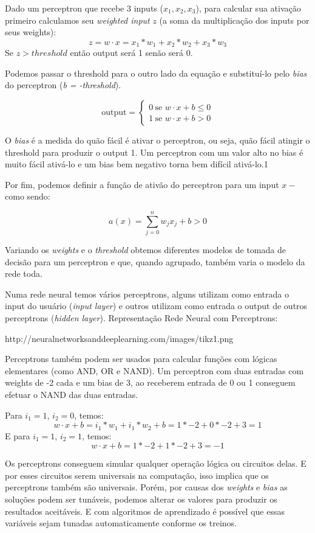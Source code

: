 \documentclass[11pt,a4paper,leqno]{article}
\begin{document}
Dado um perceptron que recebe 3 inputs ($x_1, x_2, x_3$), para calcular sua ativação primeiro calculamos seu \emph{weighted input} $z$ (a soma da multiplicação dos inputs por seus weights):
\[
	z = w \cdot x = x_1 * w_1 + x_2 * w_2 + x_3 * w_3
\]
Se $z > threshold$ então output será 1 senão será 0.

Podemos passar o threshold para o outro lado da equação e substituí-lo pelo \emph{bias} do perceptron (\emph{b = -threshold}).

\[
  \mbox{output} = \left\{ 
    \begin{array}{ll} 
      0 \ \mbox{se } w\cdot x + b \leq 0 \\
      1 \ \mbox{se } w\cdot x + b > 0
    \end{array}
  \right.
\]

O \emph{bias} é a medida do quão fácil é ativar o perceptron, ou seja, quão fácil atingir o threshold para produzir o output 1.
Um perceptron com um valor alto no bias é muito fácil ativá-lo e um bias bem negativo torna bem difícil ativá-lo.1

Por fim, podemos definir a função de ativão do perceptron para um input \emph{$x-$} como sendo:

\[
a(x) = \sum_{j=0}^n w_j x_j + b > 0
\]

Variando os \emph{weights} e o \emph{threshold} obtemos diferentes modelos de tomada de decisão para um perceptron e que, quando agrupado, também varia o modelo da rede toda.

Numa rede neural temos vários perceptrons, alguns utilizam como entrada o input do usuário (\emph{input layer}) e outros utilizam como entrada o output de outros perceptrons (\emph{hidden layer}).
\linebreak
Representação Rede Neural com Perceptrons:

http://neuralnetworksanddeeplearning.com/images/tikz1.png



Perceptrons também podem ser usados para calcular funções com lógicas elementares (como AND, OR e NAND).
Um perceptron com duas entradas com weights de -2 cada e um bias de 3, ao receberem entrada de 0 ou 1 conseguem efetuar o NAND das duas entradas.

Para $i_1 = 1$, $i_2 = 0$, temos:
\[ w \cdot x + b =  i_1 * w_1 + i_1 * w_2 + b = 1 * -2 + 0 * -2 + 3 = 1 \]
E para $i_1 = 1$, $i_2 = 1$, temos:
\[ w \cdot x + b = 1 * -2 + 1 * -2 + 3 = -1 \]

Os perceptrons conseguem simular qualquer operação lógica ou circuitos delas. E por esses circuitos serem universais na computação, isso implica que os perceptrons também são universais.
Porém, por causas dos \emph{weights} e \emph{bias} as soluções podem ser tunáveis, podemos alterar os valores para produzir os resultados aceitáveis. E com algoritmos de aprendizado é possível que essas variáveis sejam tunadas automaticamente conforme os treinos.
\end{document}

